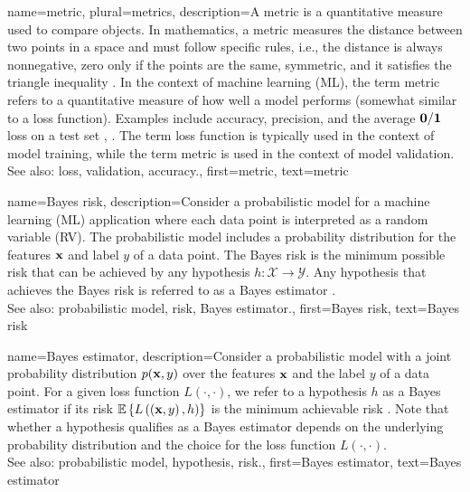 {
{name={metric}, plural={metrics},
	description={A metric is a quantitative measure used to compare objects. 
	     In mathematics, a metric measures the distance 
		 between two points in a space and must follow specific rules, i.e., the distance is always 
		 nonnegative, zero only if the points are the same, symmetric, and it satisfies the 
		triangle inequality \cite{RudinBookPrinciplesMatheAnalysis}. In the context of 
		machine learning (ML), the term metric refers to a quantitative measure of how well a model performs (somewhat 
		similar to a loss function). Examples include accuracy, precision, and the average 
		$\bf 0/1$ loss on a test set \cite{Goodfellow-et-al-2016}, \cite{BishopBook}. 
		The term loss function is typically used in the context of model training, 
		while the term metric is used in the context of model validation.
		\\ 
		See also: loss, validation, accuracy.},
	first={metric}, 
	text={metric}
}

{name={Bayes risk},
	description={Consider a probabilistic model for a machine learning (ML) application where each 
	data point is interpreted as a random variable (RV). The probabilistic model includes 
	a probability distribution for the features ${\bf x}$ and label $y$ 
	of a data point. The Bayes risk is the minimum 
	possible risk that can be achieved by any hypothesis $h: \mathcal{X} \rightarrow \mathcal{Y}$. 
		Any hypothesis that achieves the Bayes risk is referred to as a 
		Bayes estimator \cite{LC}.
		\\
		See also: probabilistic model, risk, Bayes estimator.},
	first={Bayes risk},
	text={Bayes risk}
}
	
{name={Bayes estimator},
	description={Consider a probabilistic model with a joint probability distribution 
		$p({\bf x},y)$ over the features ${\bf x}$ and the label $y$ 
		of a data point. For a given loss function $L\left(\cdot,\cdot \right)$, we refer to a hypothesis 
		$h$ as a Bayes estimator if its risk 
		$\mathbb{E} \left\{L\left(\left( {\bf x},y \right),h \right)\right\}$
		is the minimum achievable risk \cite{LC}. 
		Note that whether a hypothesis qualifies as a Bayes estimator depends on 
		the underlying probability distribution and the choice for the loss function $L\left(\cdot,\cdot \right)$.
		\\
		See also: probabilistic model, hypothesis, risk.},
	first={Bayes estimator},
	text={Bayes estimator}
}


}
